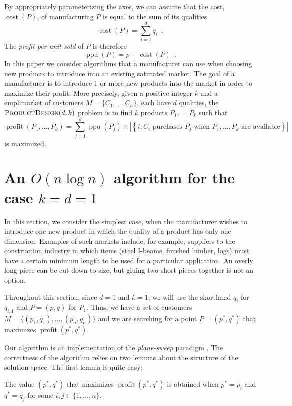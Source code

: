 \documentclass[lotsofwhite]{patmorin}
\newcommand{\cost}{\operatorname{cost}}
\newcommand{\ppu}{\operatorname{ppu}}
\newcommand{\val}{\operatorname{profit}}
\begin{document}
By appropriately parameterizing the axes, we can assume that the cost, 
$\cost(P)$, of manufacturing $P$ is equal to the sum of its qualities
\[
   \cost(P) = \sum_{i=1}^d q_i \enspace .
\]
The \emph{profit per unit sold} of $P$ is therefore
\[
   \ppu(P) = p-\cost(P) \enspace .
\]
In this paper we consider algorithms that a manufacturer can use when
choosing new products to introduce into an existing saturated market.
The goal of a manufacturer is to introduce 1 or more new products into
the market in order to maximize their profit.  More precisely, given
a positive integer $k$ and a emph{market} of customers
$M=\{C_1,\ldots,C_n\}$, each have $d$ qualities,
the $\textsc{ProductDesign}(d,k)$ problem is to find $k$ products $P_1,\ldots,P_k$ such that 
\[
  \val(P_1,\ldots,P_k) = \sum_{j=1}^k \ppu(P_j)
    \times 
      \left|
       \left\{
         i:\mbox{$C_i$ purchases $P_j$ when $P_1,\ldots,P_k$ are available}
       \right\}
      \right|
\]
is maximized.  

\section{An $O(n\log n)$ algorithm for the case $k=d=1$}

In this section, we consider the simplest case, when the manufacturer
wishes to introduce one new product in which the quality of a product
has only one dimension.  Examples of such markets include, for
example, suppliers to the construction industry in which items (steel
I-beams, finished lumber, logs) must have a certain minimum length to
be used for a particular application.  An overly long piece can be cut
down to size, but gluing two short pieces together is not an option.

Throughout this section, since $d=1$ and $k=1$, we will use the
shorthand $q_i$ for $q_{i,1}$ and $P=(p,q)$ for $P_1$.  Thus, we have
a set of customers $M=\{(p_1,q_1),\ldots,(p_{n},q_n)\}$ and we are
searching for a point $P=(p^*,q^*)$ that maximizes $\val(p^*,q^*)$.

Our algorithm is an implementation of the \emph{plane-sweep} paradigm
\cite{bsXX}.  The correctness of the algorithm relies on two lemmas
about the structure of the solution space.  The first lemma is quite
easy:

\begin{lem}
  The value $(p^*,q^*)$ that maximizes $\val(p^*,q^*)$ is obtained when
  $p^* = p_i$ and $q^*=q_j$ for some $i,j\in\{1,\ldots,n\}$.
\end{lem}
\end{document}
